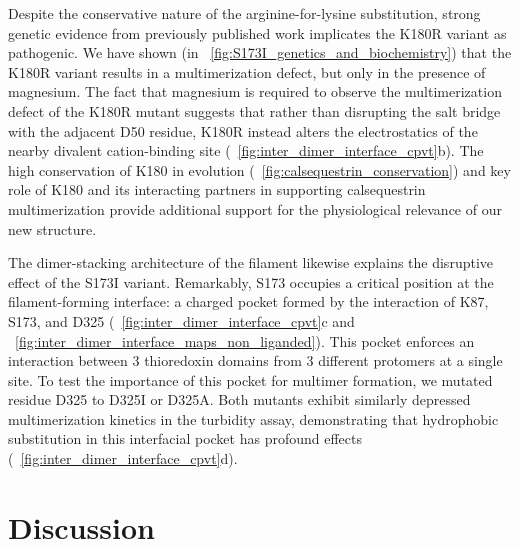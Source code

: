 Despite the conservative nature of the arginine-for-lysine substitution, strong genetic evidence from previously published work implicates the K180R variant as pathogenic. We have shown (in \maintextfigure~\ref{fig:S173I_genetics_and_biochemistry}) that the K180R variant results in a multimerization defect, but only in the presence of magnesium. The fact that magnesium is required to observe the multimerization defect of the K180R mutant suggests that rather than disrupting the salt bridge with the adjacent D50 residue, K180R instead alters the electrostatics of the nearby divalent cation-binding site (\maintextfigure~\ref{fig:inter_dimer_interface_cpvt}b). The high conservation of K180 in evolution (\supplementaryfigure~\ref{fig:calsequestrin_conservation}) and key role of K180 and its interacting partners in supporting calsequestrin multimerization provide additional support for the physiological relevance of our new structure. 

The dimer-stacking architecture of the filament likewise explains the disruptive effect of the S173I variant. Remarkably, S173 occupies a critical position at the filament-forming interface: a charged pocket formed by the interaction of K87, S173, and D325 (\maintextfigure~\ref{fig:inter_dimer_interface_cpvt}c and \extendeddatafigure~\ref{fig:inter_dimer_interface_maps_non_liganded}). This pocket enforces an interaction between 3 thioredoxin domains from 3 different protomers at a single site. To test the importance of this pocket for multimer formation, we mutated residue D325 to D325I or D325A. Both mutants exhibit similarly depressed multimerization kinetics in the turbidity assay, demonstrating that hydrophobic substitution in this interfacial pocket has profound effects (\maintextfigure~\ref{fig:inter_dimer_interface_cpvt}d).

%
%
\section{Discussion}

